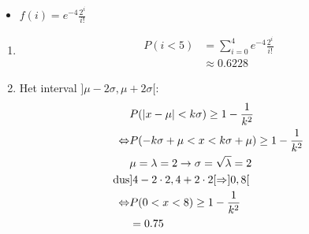 \begin{itemize}[label={}]
{{\begin{itemize}
            \item {$f(i) = e^{-4}\frac{2^i}{i!}$}
        \end{itemize}
        \begin{enumerate}
         \item 
                \begin{equation*}
                    \begin{split}
                     P(i < 5) & = \sum_{i = 0}^{4}e^{-4}\frac{2^i}{i!}\\
                              & \approx 0.6228
                    \end{split}
                \end{equation*}
         \item
            Het interval $]\mu - 2\sigma, \mu + 2\sigma[$:
            \begin{equation*}
             \begin{split}
              & P(|x -\mu| < k\sigma) \geq 1 - \frac{1}{k^2} \\
               \Leftrightarrow & P(-k\sigma + \mu < x < k\sigma + \mu) \geq 1 - \frac{1}{k^2} \\
               & \mu = \lambda = 2 \rightarrow \sigma = \sqrt{\lambda} = 2 \\
               \hbox{dus} & ]4 - 2\cdot 2, 4 + 2\cdot 2[ \Rightarrow ]0, 8[ \\
               \Leftrightarrow & P(0 < x < 8) \geq 1 - \frac{1}{k^2} \\
                              & = 0.75\\
             \end{split}
            \end{equation*}

        \end{enumerate}

}}
\end{itemize}
